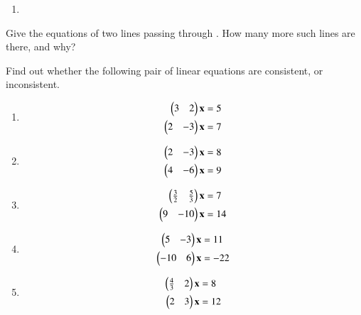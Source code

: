 %
\solution
\begin{enumerate}
\item 
\end{enumerate}
\item Give the equations of two lines passing through . How many more such lines are there, and why?
\item Find out whether the following pair of linear
equations are consistent, or inconsistent.
%
\begin{enumerate}[itemsep=2pt]
\item
\begin{align}
\begin{split}
\begin{pmatrix}3 & 2 \end{pmatrix}\mathbf{x}&=5
\\
\begin{pmatrix}2 & -3 \end{pmatrix}\mathbf{x}&=7
\end{split}
\end{align}
\item
\begin{align}
\begin{split}
\begin{pmatrix}2 & -3 \end{pmatrix}\mathbf{x}&=8
\\
\begin{pmatrix}4 & -6 \end{pmatrix}\mathbf{x}&=9
\end{split}
\end{align}
\item
\begin{align}
\begin{split}
\begin{pmatrix}\frac{3}{2} & \frac{5}{3} \end{pmatrix}\mathbf{x}&=7
\\
\begin{pmatrix}9 & -10 \end{pmatrix}\mathbf{x}&=14
\end{split}
\end{align}
\item
\begin{align}
\begin{split}
\begin{pmatrix}5 & -3 \end{pmatrix}\mathbf{x}&=11
\\
\begin{pmatrix}-10 & 6 \end{pmatrix}\mathbf{x}&=-22
\end{split}
\end{align}
\item
\begin{align}
\begin{split}
\begin{pmatrix}\frac{4}{3} & 2 \end{pmatrix}\mathbf{x}&=8
\\
\begin{pmatrix}2 & 3 \end{pmatrix}\mathbf{x}&=12
\end{split}
\end{align}
\end{enumerate}
